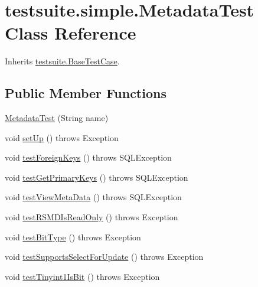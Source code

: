 \hypertarget{classtestsuite_1_1simple_1_1_metadata_test}{}\section{testsuite.\+simple.\+Metadata\+Test Class Reference}
\label{classtestsuite_1_1simple_1_1_metadata_test}


Inherits \mbox{\hyperlink{classtestsuite_1_1_base_test_case}{testsuite.\+Base\+Test\+Case}}.

\subsection*{Public Member Functions}
\begin{DoxyCompactItemize}
\item 
\mbox{\hyperlink{classtestsuite_1_1simple_1_1_metadata_test_a215f8f5f715ab9a78e98b5c48299c240}{Metadata\+Test}} (String name)
\item 
void \mbox{\hyperlink{classtestsuite_1_1simple_1_1_metadata_test_ae893b849e04ac78a5f340f55afb2cb5c}{set\+Up}} ()  throws Exception 
\item 
void \mbox{\hyperlink{classtestsuite_1_1simple_1_1_metadata_test_a52455a74082f9713ee3d04713e83af54}{test\+Foreign\+Keys}} ()  throws S\+Q\+L\+Exception 
\item 
void \mbox{\hyperlink{classtestsuite_1_1simple_1_1_metadata_test_acfb4e086733eadeb53074eb34cf25c97}{test\+Get\+Primary\+Keys}} ()  throws S\+Q\+L\+Exception 
\item 
void \mbox{\hyperlink{classtestsuite_1_1simple_1_1_metadata_test_a57723e10153ca42cc7eac867f896d662}{test\+View\+Meta\+Data}} ()  throws S\+Q\+L\+Exception 
\item 
void \mbox{\hyperlink{classtestsuite_1_1simple_1_1_metadata_test_a64f47fc5191272bd0bcf14cf6370480b}{test\+R\+S\+M\+D\+Is\+Read\+Only}} ()  throws Exception 
\item 
void \mbox{\hyperlink{classtestsuite_1_1simple_1_1_metadata_test_aa762c68b17236baad08ad296668292b7}{test\+Bit\+Type}} ()  throws Exception 
\item 
void \mbox{\hyperlink{classtestsuite_1_1simple_1_1_metadata_test_a630efab4cd749e3ac7289c477d005d67}{test\+Supports\+Select\+For\+Update}} ()  throws Exception 
\item 
void \mbox{\hyperlink{classtestsuite_1_1simple_1_1_metadata_test_aff832408212ac641e00a62d686e3c528}{test\+Tinyint1\+Is\+Bit}} ()  throws Exception 

\end{DoxyCompactItemize}
